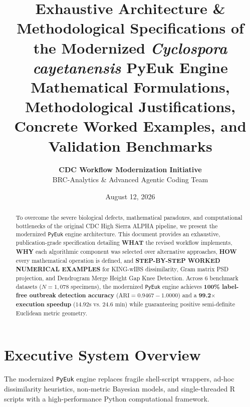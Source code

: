 \documentclass[11pt,a4paper]{article}
\title{\vspace{-1.5cm}\Huge \textbf{\color{CDCBlue} Exhaustive Architecture \& Methodological Specifications of the Modernized \textit{Cyclospora cayetanensis} PyEuk Engine}\\[0.4em]
\Large \textbf{\color{ForestGreen} Mathematical Formulations, Methodological Justifications, Concrete Worked Examples, and Validation Benchmarks}}
\author{\textbf{CDC Workflow Modernization Initiative} \\ BRC-Analytics \& Advanced Agentic Coding Team}
\date{August 12, 2026}
\begin{document}
\maketitle

\begin{abstract}
\noindent To overcome the severe biological defects, mathematical paradoxes, and computational bottlenecks of the original CDC High Sierra ALPHA pipeline, we present the modernized \texttt{PyEuk} engine architecture. This document provides an exhaustive, publication-grade specification detailing \textbf{WHAT} the revised workflow implements, \textbf{WHY} each algorithmic component was selected over alternative approaches, \textbf{HOW} every mathematical operation is defined, and \textbf{STEP-BY-STEP WORKED NUMERICAL EXAMPLES} for KING-wIBS dissimilarity, Gram matrix PSD projection, and Dendrogram Merge Height Gap Knee Detection. Across 6 benchmark datasets ($N=1,078$ specimens), the modernized \texttt{PyEuk} engine achieves \textbf{100\% label-free outbreak detection accuracy} ($\text{ARI} = 0.9467 - 1.0000$) and a \textbf{99.2$\times$ execution speedup} ($14.92\text{s}$ vs. $24.6\text{ min}$) while guaranteeing positive semi-definite Euclidean metric geometry.
\end{abstract}

\tableofcontents
\newpage

\section{Executive System Overview}

The modernized \texttt{PyEuk} engine replaces fragile shell-script wrappers, ad-hoc dissimilarity heuristics, non-metric Bayesian models, and single-threaded R scripts with a high-performance Python computational framework.
\end{document}
